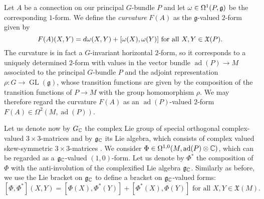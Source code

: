\documentclass[A4paper, 12pt, british, reqno]{amsart}
\DeclareMathOperator{\ad}{ad}
\DeclareMathOperator{\GL}{GL}
\newcommand{\ot}{\otimes}
\renewcommand{\X}{\mathfrak{X}}
\newcommand{\g}{\mathfrak{g}}
\begin{document}
Let $A$ be a connection on our principal $G$-bundle $P$ and let $\w\in \Omega^{1}(P,\g)$ be the corresponding $1$-form.
We define the \textit{curvature} $F(A)$ as the $\g$-valued $2$-form given by
\[ F(A)(X,Y)=d\w(X,Y)+[\w(X),\w(Y)] \text{ for all }X,Y\in \X(P). \]
The curvature is in fact a $G$-invariant horizontal $2$-form, so it corresponds to a uniquely determined $2$-form with values in the vector bundle $\ad(P)\to M$ associated to the principal $G$-bundle $P$ and the adjoint representation $\rho\colon G\to \GL(\g)$, whose transition functions are given by the composition of the transition functions of $P\to M$ with the group homomorphism $\rho$.
We may therefore regard the curvature $F(A)$ as an $\ad(P)$-valued $2$-form $F(A)\in \Omega^{2}(M,\ad(P))$.

Let us denote now by $G_{\mathbb{C}}$ the complex Lie group of special orthogonal complex-valued $3\times 3$-matrices and by $\g_{\C}$ its Lie algebra, which consists of complex valued skew-symmetric $3\times 3$-matrices \cite[Proposition 3.38]{hal15}.
We consider $\Phi\in \Omega^{1,0}(M,\ad(P)\ot \C)$, which can be regarded as a $\g_{\C}$-valued $(1,0)$-form.
Let us denote by $\Phi^{*}$ the composition of $\Phi$ with the anti-involution of the complexified Lie algebra $\g_{\C}$.
Similarly as before, we use the Lie bracket on $\g_{\C}$ to define a bracket on $\g_{\C}$-valued forms:
\[ [\Phi,\Phi^{*}](X,Y)=[\Phi(X),\Phi^{*}(Y)]+[\Phi^{*}(X),\Phi(Y)] \text{ for all }X,Y\in \X(M). \]





\vfill
\end{document}
